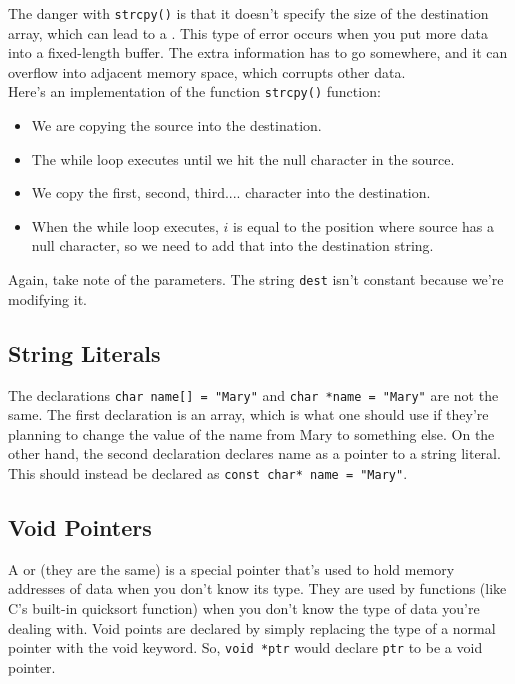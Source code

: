 The danger with \verb!strcpy()! is that it doesn't specify the size of the destination array, which can lead to a . This type of error occurs when you put more data into a fixed-length buffer. The extra information has to go somewhere, and it can overflow into adjacent memory space, which corrupts other data. \\


Here's an implementation of the function \verb!strcpy()! function: 

\lstset{
caption=String Copy Implementation
}
\begin{center}
\label{Pointer to a Local Variable}
\end{center}

\begin{itemize}
    \item We are copying the source into the destination.
    \item The while loop executes until we hit the null character in the source.
    \item We copy the first, second, third.... character into the destination. 
    \item When the while loop executes, $i$ is equal to the position where source has a null character, so we need to add that into the destination string.
\end{itemize}

Again, take note of the parameters. The string \verb!dest! isn't constant because we're modifying it. 

\subsection{String Literals}

The declarations \verb!char name[] = "Mary"! and \verb!char *name = "Mary"! are not the same. The first declaration is an array, which is what one should use if they're planning to change the value of the name from Mary to something else. On the other hand, the second declaration declares name as a pointer to a string literal. This should instead be declared as \verb!const char* name = "Mary"!. \\



\subsection{Void Pointers}
A  or  (they are the same) is a special pointer that's used to hold memory addresses of data when you don't know its type. They are used by functions (like C's built-in quicksort function) when you don't know the type of data you're dealing with. Void points are declared by simply replacing the type of a normal pointer with the void keyword. So, \verb!void *ptr! would declare \verb!ptr! to be a void pointer. \\

